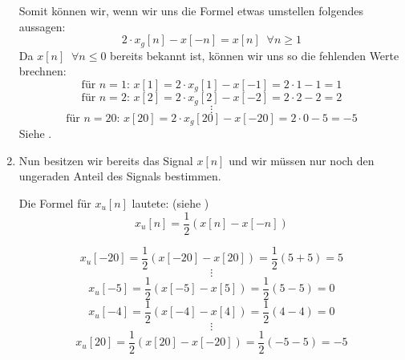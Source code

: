\begin{uebsp}
\begin{Answer}
\begin{enumerate}
                Somit können wir, wenn wir uns die Formel etwas umstellen folgendes aussagen:
                \[2\cdot x_g[n]-x[-n]=x[n]\;\;\forall n\geq 1\]
                Da $x[n]\;\;\forall n\leq0$ bereits bekannt ist, können wir uns so die fehlenden Werte brechnen:\\
                \[\text{für $n=1$: }x[1]=2\cdot x_g[1]-x[-1]=2\cdot 1-1=1\]
                \[\text{für $n=2$: }x[2]=2\cdot x_g[2]-x[-2]=2\cdot 2-2=2\]
                \[\vdots\]
                \[\text{für $n=20$: }x[20]=2\cdot x_g[20]-x[-20]=2\cdot 0-5=-5\]
                Siehe .

                \begin{center}
                \end{center}

            \item Nun besitzen wir bereits das Signal $x[n]$ und wir müssen nur noch den ungeraden Anteil des Signals bestimmen. 
                \begin{uebsp_theory}
                    Die Formel für $x_u[n]$ lautete: (siehe )
                    \[x_u[n]=\frac{1}{2}(x[n]-x[-n])\]
                \end{uebsp_theory}

                \[x_u[-20]=\frac{1}{2}(x[-20]-x[20])=\frac{1}{2}(5+5)=5\]
                \[\vdots\]
                \[x_u[-5]=\frac{1}{2}(x[-5]-x[5])=\frac{1}{2}(5-5)=0\]
                \[x_u[-4]=\frac{1}{2}(x[-4]-x[4])=\frac{1}{2}(4-4)=0\]
                \[\vdots\]
                \[x_u[20]=\frac{1}{2}(x[20]-x[-20])=\frac{1}{2}(-5-5)=-5\]


\end{enumerate}
\end{Answer}
\end{uebsp}

